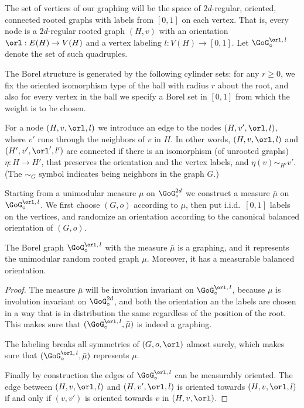 The set of vertices of our graphing will be the space of $2d$-regular, oriented, connected rooted graphs with labels from $[0,1]$ on each vertex. That is, every node is a $2d$-regular rooted graph $(H,v)$ with an orientation $\orl: E(H) \to V(H)$ and a vertex labeling $l: V(H) \to [0,1]$. Let $\GoG^{\orl,\,l}_{\circ}$ denote the set of such quadruples.

The Borel structure is generated by the following cylinder sets: for any $r \geq 0$, we fix the oriented isomorphism type of the ball with radius $r$ about the root, and also for every vertex in the ball we specify a Borel set in $[0, 1]$ from which the weight is to be chosen.

For a node $(H,v,\orl, l)$ we introduce an edge to the nodes $(H,v',\orl, l)$, where $v'$ runs through the neighbors of $v$ in $H$. In other words, $(H,v,\orl, l)$ and $(H',v',\orl ', l')$ are connected if there is an isomorphism (of unrooted graphs) $\eta: H \to H'$, that preserves the orientation and the vertex labels, and $\eta(v) \sim_{H'} v'$. (The $\sim_G$ symbol indicates being neighbors in the graph $G$.)

Starting from a unimodular measure $\mu$ on $\GoG_{\circ}^{2d}$ we construct a measure $\bar{\mu}$ on $\GoG^{\orl,\,l}_{\circ}$. We first choose $(G,o)$ according to $\mu$, then put i.i.d.\ $[0,1]$ labels on the vertices, and randomize an orientation according to the canonical balanced orientation of $(G,o)$.

\begin{prop}\label{proposition:orientable_graphing}
The Borel graph $\GoG^{\orl,\,l}_{\circ}$ with the measure $\bar{\mu}$ is a graphing, and it represents the unimodular random rooted graph $\mu$. Moreover, it has a measurable balanced orientation.
\end{prop}

\begin{proof}
The measure $\bar{\mu}$ will be involution invariant on $\GoG^{\orl,\,l}_{\circ}$, because $\mu$ is involution invariant on $\GoG_{\circ}^{2d}$, and both the orientation an the labels are chosen in a way that is in distribution the same regardless of the position of the root. This makes sure that $(\GoG^{\orl,\,l}_{\circ}, \bar{\mu})$ is indeed a graphing.

The labeling breaks all symmetries of $(G,o, \orl)$ almost surely, which makes sure that $(\GoG^{\orl,\,l}_{\circ}, \bar{\mu})$ represents $\mu$.

Finally by construction the edges of $\GoG^{\orl,\,l}_{\circ}$ can be measurably oriented. The edge between $(H,v,\orl, l)$ and $(H,v',\orl, l)$ is oriented towards $(H,v,\orl, l)$ if and only if $(v,v')$ is oriented towards $v$ in $(H,v,\orl)$.
\end{proof}

